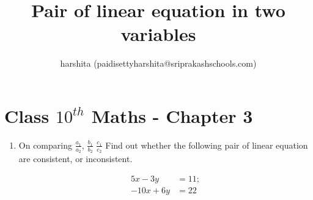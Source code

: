 \documentclass[12pt]{article}
\title{Pair of linear equation in two variables}
\author{harshita (paidisettyharshita@sriprakashschools.com)}
\begin{document}
\maketitle
\section*{Class $10^{th}$ Maths - Chapter 3}

\begin{enumerate}
 \item On comparing $\frac{a_1}{a_2}$, $\frac{b_1}{b_2}$ $\frac{c_1}{c_2} $
Find out whether the following pair of linear equation are consistent, or inconsistent.

\begin{align}
5x-3y&=11;\\
-10x+6y&=22
\end{align}




\end{enumerate}
\end{document}
